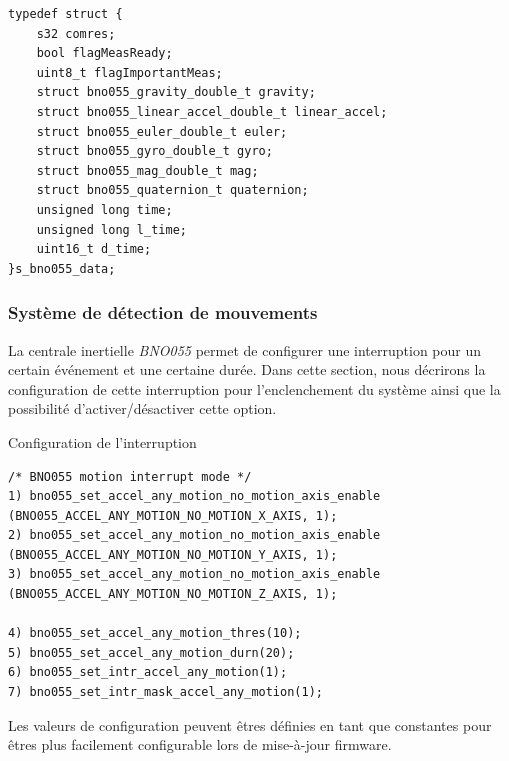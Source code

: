 \begin{verbatim}
typedef struct {
	s32 comres;
	bool flagMeasReady;
	uint8_t flagImportantMeas;
	struct bno055_gravity_double_t gravity;
	struct bno055_linear_accel_double_t linear_accel;
	struct bno055_euler_double_t euler;
	struct bno055_gyro_double_t gyro;
	struct bno055_mag_double_t mag;
	struct bno055_quaternion_t quaternion;
	unsigned long time;
	unsigned long l_time;
	uint16_t d_time;
}s_bno055_data;
\end{verbatim}

\subsubsection{Système de détection de mouvements}

La centrale inertielle \textit{BNO055} permet de configurer une interruption pour un certain événement et une certaine durée. Dans cette section, nous décrirons la configuration de cette interruption pour l'enclenchement du système ainsi que la possibilité d'activer/désactiver cette option.

\begin{code}
\caption{Configuration de l'interruption}
\label{code:configInt}
\begin{verbatim}
/* BNO055 motion interrupt mode */
1) bno055_set_accel_any_motion_no_motion_axis_enable (BNO055_ACCEL_ANY_MOTION_NO_MOTION_X_AXIS, 1);
2) bno055_set_accel_any_motion_no_motion_axis_enable (BNO055_ACCEL_ANY_MOTION_NO_MOTION_Y_AXIS, 1);
3) bno055_set_accel_any_motion_no_motion_axis_enable (BNO055_ACCEL_ANY_MOTION_NO_MOTION_Z_AXIS, 1);

4) bno055_set_accel_any_motion_thres(10);
5) bno055_set_accel_any_motion_durn(20);
6) bno055_set_intr_accel_any_motion(1);
7) bno055_set_intr_mask_accel_any_motion(1);	
\end{verbatim}
\end{code}

Les valeurs de configuration peuvent êtres définies en tant que constantes pour êtres plus facilement configurable lors de mise-à-jour firmware.

